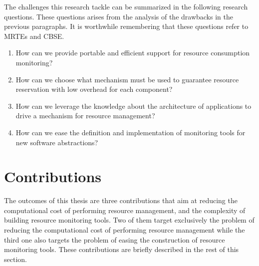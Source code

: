 The challenges this research tackle can be summarized in the following research questions.
These questions arises from the analysis of the drawbacks in the previous paragraphs.
It is worthwhile remembering that these questions refer to MRTEs and CBSE.

\begin{enumerate}
\renewcommand{\theenumi}{\textit{RQ\arabic{enumi}}}

\item How can we provide portable and efficient support for resource consumption monitoring? \label{rq:rq1}

\item How can we choose what mechanism must be used to guarantee resource reservation with low overhead for each component? \label{rq:rq2}

\item How can we leverage the knowledge about the architecture of applications to drive a mechanism for resource management? \label{rq:rq3}

\item How can we ease the definition and implementation of monitoring tools for new software abstractions? \label{rq:rq4}
\end{enumerate}
 
\section{Contributions}

The outcomes of this thesis are three contributions that aim at reducing the computational cost of performing resource management, and the complexity of building resource monitoring tools.
Two of them target exclusively the problem of reducing the computational cost of performing resource management while the third one also targets the problem of easing the construction of resource monitoring tools. 
These contributions are briefly described in the rest of this section.

